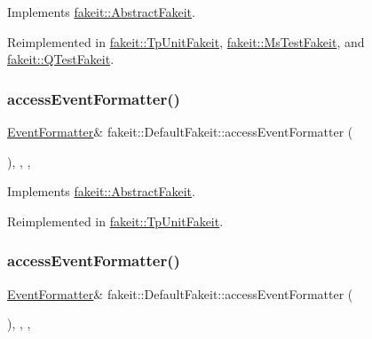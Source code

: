 Implements \mbox{\hyperlink{classfakeit_1_1AbstractFakeit_a443a7ac12208c55f2ae4fa072e983476}{fakeit\+::\+Abstract\+Fakeit}}.



Reimplemented in \mbox{\hyperlink{classfakeit_1_1TpUnitFakeit_ae0f3713842b30e36ee1b0ce03a070b59}{fakeit\+::\+Tp\+Unit\+Fakeit}}, \mbox{\hyperlink{classfakeit_1_1MsTestFakeit_ad4e89ab859aa132a1f35fc0fea7d05a2}{fakeit\+::\+Ms\+Test\+Fakeit}}, and \mbox{\hyperlink{classfakeit_1_1QTestFakeit_a3760d57c61ed1572bcf5cded00f643ec}{fakeit\+::\+Q\+Test\+Fakeit}}.

\mbox{\label{classfakeit_1_1DefaultFakeit_a02cb8f08a94e7bf830c87f74f20c9bd9}} 
\subsubsection{\texorpdfstring{accessEventFormatter()}{accessEventFormatter()}\hspace{0.1cm}{\footnotesize\ttfamily [3/9]}}
{\footnotesize\ttfamily \mbox{\hyperlink{structfakeit_1_1EventFormatter}{Event\+Formatter}}\& fakeit\+::\+Default\+Fakeit\+::access\+Event\+Formatter (\begin{DoxyParamCaption}{ }\end{DoxyParamCaption})\hspace{0.3cm}{\ttfamily [inline]}, {\ttfamily [override]}, {\ttfamily [protected]}, {\ttfamily [virtual]}}



Implements \mbox{\hyperlink{classfakeit_1_1AbstractFakeit_a443a7ac12208c55f2ae4fa072e983476}{fakeit\+::\+Abstract\+Fakeit}}.



Reimplemented in \mbox{\hyperlink{classfakeit_1_1TpUnitFakeit_ae0f3713842b30e36ee1b0ce03a070b59}{fakeit\+::\+Tp\+Unit\+Fakeit}}.

\mbox{\label{classfakeit_1_1DefaultFakeit_a02cb8f08a94e7bf830c87f74f20c9bd9}} 
\subsubsection{\texorpdfstring{accessEventFormatter()}{accessEventFormatter()}\hspace{0.1cm}{\footnotesize\ttfamily [4/9]}}
{\footnotesize\ttfamily \mbox{\hyperlink{structfakeit_1_1EventFormatter}{Event\+Formatter}}\& fakeit\+::\+Default\+Fakeit\+::access\+Event\+Formatter (\begin{DoxyParamCaption}{ }\end{DoxyParamCaption})\hspace{0.3cm}{\ttfamily [inline]}, {\ttfamily [override]}, {\ttfamily [protected]}, {\ttfamily [virtual]}}



